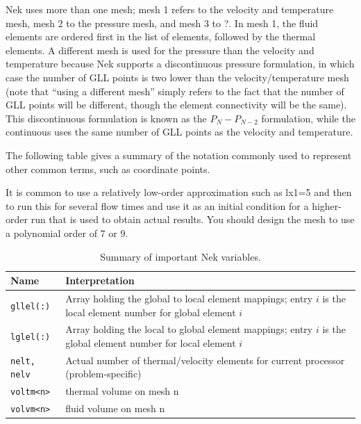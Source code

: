 \documentclass[10pt]{article}
\numberwithin{equation}{section} %
\begin{document}
Nek uses more than one mesh; mesh 1 refers to the velocity and temperature mesh, mesh 2 to the pressure mesh, and mesh 3 to ?. In mesh 1, the fluid elements are ordered first in the list of elements, followed by the thermal elements. A different mesh is used for the pressure than the velocity and temperature because Nek supports a discontinuous pressure formulation, in which case the number of GLL points is two lower than the velocity/temperature mesh (note that ``using a different mesh'' simply refers to the fact that the number of GLL points will be different, though the element connectivity will be the same). This discontinuous formulation is known as the \(P_N-P_{N-2}\) formulation, while the continuous uses the same number of GLL points as the velocity and temperature.





The following table gives a summary of the notation commonly used to represent other common terms, such as coordinate points.



It is common to use a relatively low-order approximation such as lx1=5 and then to run this for several flow times and use it as an initial condition for a higher-order run that is used to obtain actual results. You should design the mesh to use a polynomial order of 7 or 9.

\begin{table}[H]
\caption{Summary of important Nek variables.}
\centering
\begin{tabular}{p{2cm}p{13cm}}
\hline\hline
Name & Interpretation \\ [0.5ex]
\hline
{\tt gllel(:)} & Array holding the global to local element mappings; entry \(i\) is the local element number for global element \(i\)\\
{\tt lglel(:)} & Array holding the local to global element mappings; entry \(i\) is the global element number for local element \(i\)\\
{\tt nelt, nelv} & Actual number of thermal/velocity elements for current processor (problem-specific)\\
{\tt voltm<n>} & thermal volume on mesh n\\
{\tt volvm<n>} & fluid volume on mesh n\\
\hline
\end{tabular}
\end{table}
\end{document}
